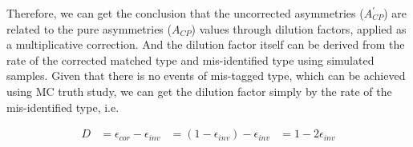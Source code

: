 Therefore, we can get the conclusion that the uncorrected asymmetries ($A^\prime_{CP}$) are related to the pure asymmetries ($A_{CP}$) values through dilution factors, applied as a multiplicative correction. 
And the dilution factor itself can be derived from the rate of the corrected matched type and mis-identified type using \ttbar simulated samples.
Given that there is no events of mis-tagged type, which can be achieved using MC truth study, we can get the dilution factor simply by the rate of the mis-identified type, i.e.

\begin{align}\label{eq:dilution_wrong_sign}
    D &= \epsilon_{cor} - \epsilon_{inv}
      &= ( 1 -  \epsilon_{inv} ) -  \epsilon_{inv}
      &= 1 - 2\epsilon_{inv} 
\end{align}
